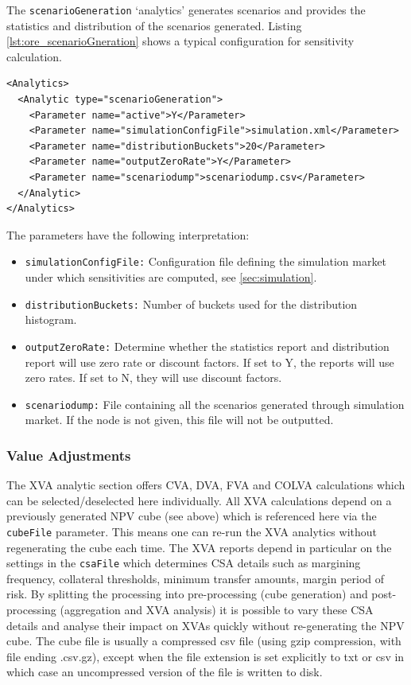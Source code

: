 The {\tt scenarioGeneration} `analytics' generates scenarios and provides the statistics and distribution of the scenarios generated. Listing \ref{lst:ore_scenarioGneration}
shows a typical configuration for sensitivity calculation.

\begin{listing}[H]
\begin{verbatim}
<Analytics>
  <Analytic type="scenarioGeneration">
	<Parameter name="active">Y</Parameter>
	<Parameter name="simulationConfigFile">simulation.xml</Parameter>
	<Parameter name="distributionBuckets">20</Parameter>
	<Parameter name="outputZeroRate">Y</Parameter>
	<Parameter name="scenariodump">scenariodump.csv</Parameter>
  </Analytic>
</Analytics>
\end{verbatim}
\caption{ORE analytic: scenarioGeneration}
\label{lst:ore_scenarioGeneration}
\end{listing}

The parameters have the following interpretation:

\begin{itemize}
\item {\tt simulationConfigFile:} Configuration file defining the simulation market under which sensitivities are computed,
  see \ref{sec:simulation}.
\item {\tt distributionBuckets:} Number of buckets used for the distribution histogram.
\item {\tt outputZeroRate:} Determine whether the statistics report and distribution report will use zero rate or discount factors. If set to Y, the reports will use zero rates. If set to N, they will use discount factors.
\item {\tt scenariodump:} File containing all the scenarios generated through simulation market. If the node is not given, this file will not be outputted.
\end{itemize}

\subsubsection{Value Adjustments}

The XVA analytic section offers CVA, DVA, FVA and COLVA calculations which can be selected/deselected here
individually. All XVA calculations depend on a previously generated NPV cube (see above) which is referenced here via
the {\tt cubeFile} parameter. This means one can re-run the XVA analytics without regenerating the cube each time. The
XVA reports depend in particular on the settings in the {\tt csaFile} which determines CSA details such as margining
frequency, collateral thresholds, minimum transfer amounts, margin period of risk. By splitting the processing into
pre-processing (cube generation) and post-processing (aggregation and XVA analysis) it is possible to vary these CSA
details and analyse their impact on XVAs quickly without re-generating the NPV cube. The cube file is usually a
compressed csv file (using gzip compression, with file ending .csv.gz), except when the file extension is set explicitly
to txt or csv in which case an uncompressed version of the file is written to disk.

